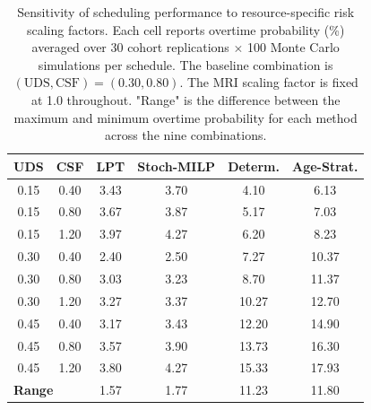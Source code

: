 \documentclass[11pt,a4paper]{article}
\begin{document}
\begin{table}[htbp]
\centering
\caption{Sensitivity of scheduling performance to resource-specific risk scaling factors. Each cell reports overtime probability (\%) averaged over 30 cohort replications $\times$ 100 Monte Carlo simulations per schedule. The baseline combination is $(\text{UDS}, \text{CSF}) = (0.30, 0.80)$. The MRI scaling factor is fixed at 1.0 throughout. "Range" is the difference between the maximum and minimum overtime probability for each method across the nine combinations.}
\label{tab:scaling_sensitivity}
\begin{tabular}{@{}cc cccc@{}}
\toprule
\textbf{UDS} & \textbf{CSF} & \textbf{LPT} & \textbf{Stoch-MILP} & \textbf{Determ.} & \textbf{Age-Strat.} \\
\midrule
0.15 & 0.40 & 3.43 & 3.70 & 4.10  & 6.13 \\
0.15 & 0.80 & 3.67 & 3.87 & 5.17  & 7.03 \\
0.15 & 1.20 & 3.97 & 4.27 & 6.20  & 8.23 \\
0.30 & 0.40 & 2.40 & 2.50 & 7.27  & 10.37 \\
0.30 & 0.80 & 3.03 & 3.23 & 8.70  & 11.37 \\
0.30 & 1.20 & 3.27 & 3.37 & 10.27 & 12.70 \\
0.45 & 0.40 & 3.17 & 3.43 & 12.20 & 14.90 \\
0.45 & 0.80 & 3.57 & 3.90 & 13.73 & 16.30 \\
0.45 & 1.20 & 3.80 & 4.27 & 15.33 & 17.93 \\
\midrule
\multicolumn{2}{l}{\textbf{Range}}     & 1.57 & 1.77 & 11.23 & 11.80 \\
\bottomrule
\end{tabular}
\end{table}
\end{document}
